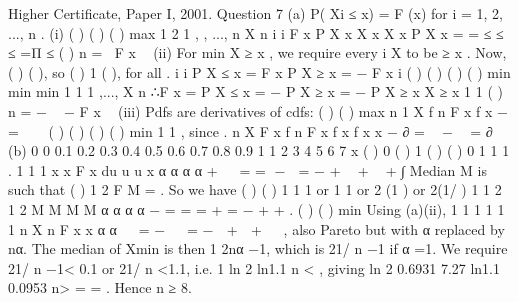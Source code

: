 \documentclass[a4paper,12pt]{article}
\begin{document}
Higher Certificate, Paper I, 2001. Question 7
(a) P( Xi ≤ x) = F (x) for i = 1, 2, ..., n .
(i) ( ) ( ) ( ) max 1 2
1
, , ...,
n
X n i
i
F x P X x X x X x P X x
=
= ≤ ≤ ≤ =Π ≤
( ) n = F x 
(ii) For min X ≥ x , we require every i X to be ≥ x .
Now, ( ) ( ), so ( ) 1 ( ), for all . i i P X ≤ x = F x P X ≥ x = − F x i
( ) ( ) ( ) ( ) min min min 1 1 1 ,..., X n ∴F x = P X ≤ x = − P X ≥ x = − P X ≥ x X ≥ x
1 1 ( ) n = −  − F x 
(iii) Pdfs are derivatives of cdfs:
( ) ( ) max
n 1
X f n F x f x − =  
( ) ( ) ( ) ( ) min
1 1 , since . n
X
F x
f n F x f x f x
x
− ∂
=  −  = ∂
(b)
0
0
0.1
0.2
0.3
0.4
0.5
0.6
0.7
0.8
0.9
1
1 2 3 4 5 6 7
x
( )
0 ( ) 1 ( ) ( )
0
1 1 1 .
1 1 1
x
x F x du
u u x α α α
α
+
 
= = −  = −
+  +  +
∫
Median M is such that ( ) 1
2
F M = . So we have
( ) ( )
1 1 1 or 1 1 or 2 (1 ) or 2(1/ ) 1
1 2 1 2
M M
M M
α α
α α − = = = + = −
+ +
.
( ) ( ) min
Using (a)(ii), 1 1 1 1
1 1
n
X n F
x x α α
 
= −   = −
 +  +  
, also Pareto but with α replaced
by nα.
The median of Xmin is then
1
2nα −1, which is 21/ n −1 if α =1. We require
21/ n −1< 0.1 or 21/ n <1.1, i.e. 1 ln 2 ln1.1
n
< , giving ln 2 0.6931 7.27
ln1.1 0.0953
n> = = .
Hence n ≥ 8.
\end{document}
